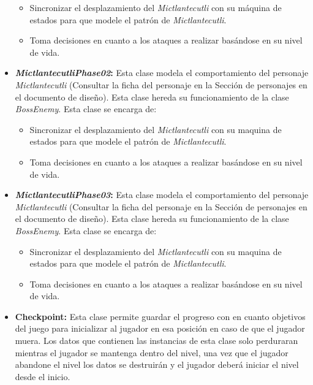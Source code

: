 \begin{itemize}
\begin{itemize}
				\item Sincronizar el desplazamiento del \textit{Mictlantecutli} con su máquina 
				de estados para que modele el patrón de \textit{Mictlantecutli}.
				\item Toma decisiones en cuanto a los ataques a realizar basándose en su 
				nivel de vida.
			\end{itemize}
			\item \textbf{\textit{MictlantecutliPhase02}:} Esta clase modela el 
			comportamiento del personaje \textit{Mictlantecutli} (Consultar la ficha 
			del personaje en la Sección de personajes en 
			el documento de diseño). Esta clase hereda su funcionamiento de la clase 
			\textit{BossEnemy}. Esta clase se encarga de:  
			\begin{itemize}
				\item Sincronizar el desplazamiento del \textit{Mictlantecutli} con su maquina 
				de estados para que modele el patrón de \textit{Mictlantecutli}.
				\item Toma decisiones en cuanto a los ataques a realizar basándose en su 
				nivel de vida.
			\end{itemize}
			\item \textbf{\textit{MictlantecutliPhase03}:} Esta clase modela el 
			comportamiento del personaje \textit{Mictlantecutli} (Consultar la ficha 
			del personaje en la Sección de personajes en 
			el documento de diseño). Esta clase hereda su funcionamiento de la clase 
			\textit{BossEnemy}. Esta clase se encarga de:  
			\begin{itemize}
				\item Sincronizar el desplazamiento del \textit{Mictlantecutli} con su maquina 
				de estados para que modele el patrón de \textit{Mictlantecutli}.
				\item Toma decisiones en cuanto a los ataques a realizar basándose en su 
				nivel de vida.
			\end{itemize}
			\item \textbf{Checkpoint:} Esta clase permite guardar el progreso con en 
			cuanto objetivos del juego para inicializar al jugador en esa posición
			en caso de que el jugador muera. Los datos que contienen las instancias de
			esta clase solo perduraran mientras el jugador se mantenga dentro del nivel,
			una vez que el jugador abandone el nivel los datos se destruirán y el jugador
			deberá iniciar el nivel desde el inicio.  

\end{itemize}

